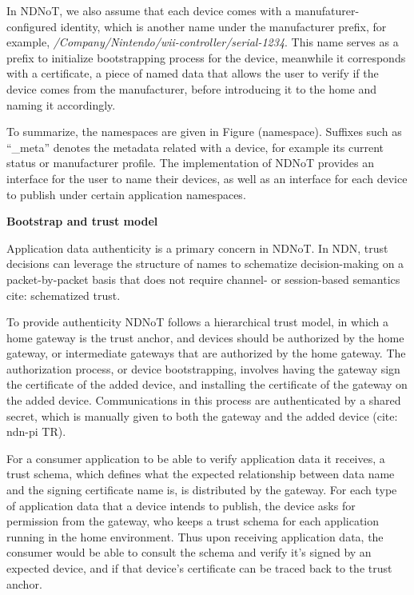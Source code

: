 \documentclass{sig-alternate-05-2015}
\begin{document}
In NDNoT, we also assume that each device comes with a manufaturer-configured identity, which is another name under the manufacturer prefix, for example, \textit{/Company/Nintendo/wii-controller/serial-1234}. This name serves as a prefix to initialize bootstrapping process for the device, meanwhile it corresponds with a certificate, a piece of named data that allows the user to verify if the device comes from the manufacturer, before introducing it to the home and naming it accordingly.

To summarize, the namespaces are given in Figure (namespace). Suffixes such as ``\_meta'' denotes the metadata related with a device, for example its current status or manufacturer profile. The implementation of NDNoT provides an interface for the user to name their devices, as well as an interface for each device to publish under certain application namespaces.

\textbf{Bootstrap and trust model}

Application data authenticity is a primary concern in NDNoT. In NDN, trust decisions can leverage the structure of names to schematize decision-making on a packet-by-packet basis that does not require channel- or session-based semantics {cite: schematized trust}.

To provide authenticity NDNoT follows a hierarchical trust model, in which a home gateway is the trust anchor, and devices should be authorized by the home gateway, or intermediate gateways that are authorized by the home gateway. The authorization process, or device bootstrapping, involves having the gateway sign the certificate of the added device, and installing the certificate of the gateway on the added device. Communications in this process are authenticated by a shared secret, which is manually given to both the gateway and the added device (cite: ndn-pi TR). 

For a consumer application to be able to verify application data it receives, a trust schema, which defines what the expected relationship between data name and the signing certificate name is, is distributed by the gateway. For each type of application data that a device intends to publish, the device asks for permission from the gateway, who keeps a trust schema for each application running in the home environment. Thus upon receiving application data, the consumer would be able to consult the schema and verify it's signed by an expected device, and if that device's certificate can be traced back to the trust anchor.
\end{document}
